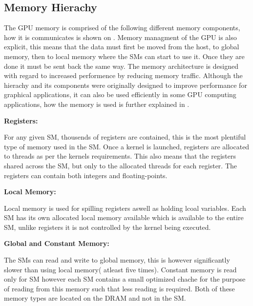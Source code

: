 \subsection{Memory Hierachy}

The GPU memory is comprised of the following different memory components, how it is communicates is shown on . %
Memory managment of the GPU is also explicit, this means that the data must first be moved from the host, to global memory, then to local memory where the SMs can start to use it. 
Once they are done it must be sent back the same way.
The memory architecture is designed with regard to increased performence by reducing memory traffic.
Although the hierachy and its components were originally designed to improve performance for graphical applications, it can also be used efficiently in some GPU computing applications, how the memory is used is further explained in . %

\textbf{Registers:}

For any given SM, thousends of registers are contained, this is the most plentiful type of memory used in the SM. 
Once a kernel is launched, registers are allocated to threads as per the kernels requirements.
This also means that the registers shared across the SM, but only to the allocated threads for each register.
The registers can contain both integers and floating-points.

\textbf{Local Memory:}

Local memory is used for spilling registers aswell as holding lcoal variables.
Each SM has its own allocated local memory available which is available to the entire SM, unlike registers it is not controlled by the kernel being executed.

\textbf{Global and Constant Memory:}

The SMs can read and write to global memory, this is however significantly slower than using local memory( atleast five times). %
Constant memory is read only for SM however each SM contains a small optimized chache for the purpose of reading from this memory such that less reading is required. Both of these memory types are located on the DRAM and not in the SM.

